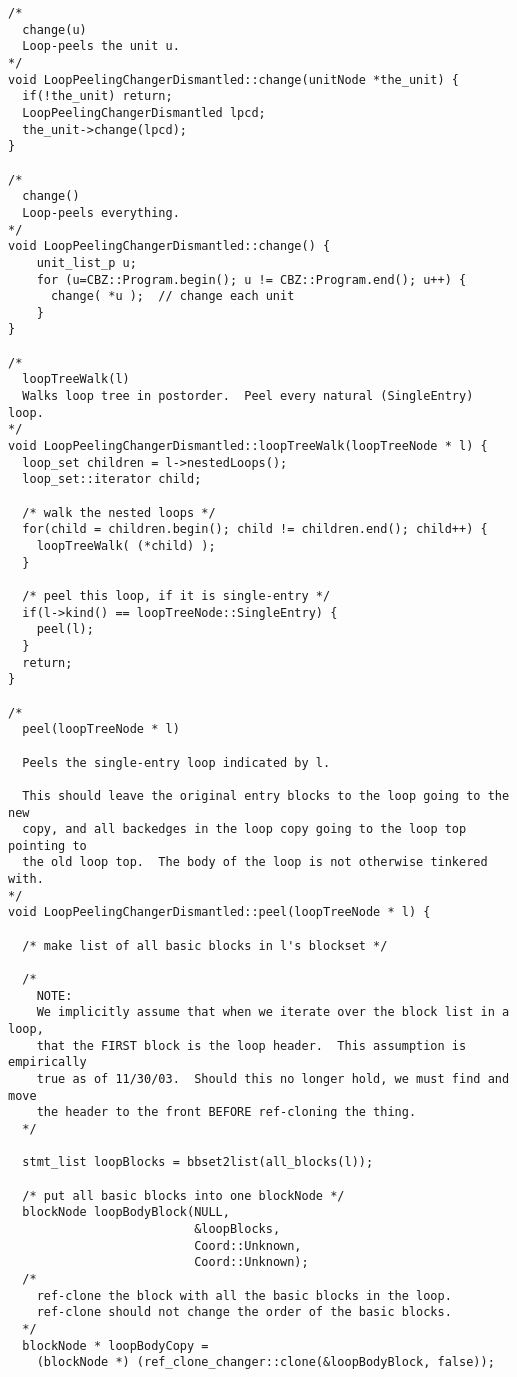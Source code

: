 \documentclass[10pt]{article}
\begin{document}
\begin{small}
\begin{verbatim}
/*
  change(u)
  Loop-peels the unit u.
*/
void LoopPeelingChangerDismantled::change(unitNode *the_unit) {
  if(!the_unit) return;
  LoopPeelingChangerDismantled lpcd;
  the_unit->change(lpcd);
}

/*
  change()
  Loop-peels everything.
*/
void LoopPeelingChangerDismantled::change() {
    unit_list_p u;
    for (u=CBZ::Program.begin(); u != CBZ::Program.end(); u++) {
      change( *u );  // change each unit
    }
}

/*
  loopTreeWalk(l)
  Walks loop tree in postorder.  Peel every natural (SingleEntry) loop.
*/
void LoopPeelingChangerDismantled::loopTreeWalk(loopTreeNode * l) {
  loop_set children = l->nestedLoops();
  loop_set::iterator child;

  /* walk the nested loops */
  for(child = children.begin(); child != children.end(); child++) {
    loopTreeWalk( (*child) );
  }

  /* peel this loop, if it is single-entry */
  if(l->kind() == loopTreeNode::SingleEntry) {
    peel(l);
  }
  return;
}

/*
  peel(loopTreeNode * l)

  Peels the single-entry loop indicated by l.

  This should leave the original entry blocks to the loop going to the new
  copy, and all backedges in the loop copy going to the loop top pointing to
  the old loop top.  The body of the loop is not otherwise tinkered with.
*/
void LoopPeelingChangerDismantled::peel(loopTreeNode * l) {

  /* make list of all basic blocks in l's blockset */

  /*
    NOTE:
    We implicitly assume that when we iterate over the block list in a loop,
    that the FIRST block is the loop header.  This assumption is empirically
    true as of 11/30/03.  Should this no longer hold, we must find and move
    the header to the front BEFORE ref-cloning the thing.
  */

  stmt_list loopBlocks = bbset2list(all_blocks(l));

  /* put all basic blocks into one blockNode */
  blockNode loopBodyBlock(NULL,
                          &loopBlocks,
                          Coord::Unknown,
                          Coord::Unknown);
  /*
    ref-clone the block with all the basic blocks in the loop.
    ref-clone should not change the order of the basic blocks.
  */
  blockNode * loopBodyCopy = 
    (blockNode *) (ref_clone_changer::clone(&loopBodyBlock, false));


\end{verbatim}
\end{small}
\end{document}
